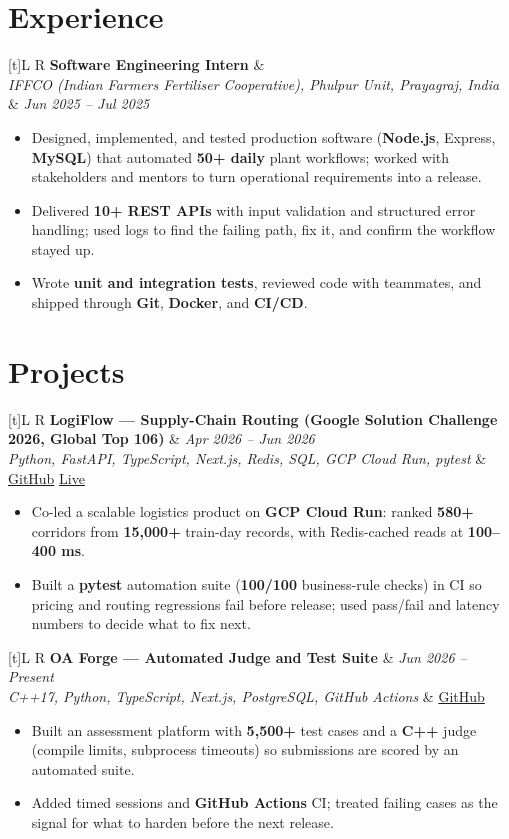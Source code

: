 \documentclass[a4paper,10pt]{article}
\newcommand{\resumeSubheading}[4]{%
  \vspace{0.4mm}
  \noindent
  \begin{tabularx}{\textwidth}[t]{L R}
    \textbf{#1} & #4 \\
    \textit{#3} & \textit{#2} \\
  \end{tabularx}
  \vspace{-0.4mm}%
}
\newcommand{\resumeProject}[4]{%
  \vspace{0.4mm}
  \noindent
  \begin{tabularx}{\textwidth}[t]{L R}
    \textbf{#1} & \textit{#3} \\
    \textit{#2} & #4 \\
  \end{tabularx}
  \vspace{-0.4mm}%
}
\begin{document}
\section{Experience}
\small
\resumeSubheading
  {Software Engineering Intern}{Jun 2025 -- Jul 2025}
  {IFFCO (Indian Farmers Fertiliser Cooperative), Phulpur Unit, Prayagraj, India}{}
\begin{itemize}
  \item Designed, implemented, and tested production software (\textbf{Node.js}, Express, \textbf{MySQL}) that automated \textbf{50+ daily} plant workflows; worked with stakeholders and mentors to turn operational requirements into a release.
  \item Delivered \textbf{10+ REST APIs} with input validation and structured error handling; used logs to find the failing path, fix it, and confirm the workflow stayed up.
  \item Wrote \textbf{unit and integration tests}, reviewed code with teammates, and shipped through \textbf{Git}, \textbf{Docker}, and \textbf{CI/CD}.
\end{itemize}

\section{Projects}
\small

\resumeProject
  {LogiFlow --- Supply-Chain Routing (Google Solution Challenge 2026, Global Top 106)}
  {Python, FastAPI, TypeScript, Next.js, Redis, SQL, GCP Cloud Run, pytest}
  {Apr 2026 -- Jun 2026}
  {\href{https://github.com/Ojas-Srivastava05/LogiFlow-Solution-Challenge-2026}{GitHub} \textbar{} \href{https://logi-flow-solution-challenge-2026.vercel.app}{Live}}
\begin{itemize}
  \item Co-led a scalable logistics product on \textbf{GCP Cloud Run}: ranked \textbf{580+} corridors from \textbf{15,000+} train-day records, with Redis-cached reads at \textbf{100--400 ms}.
  \item Built a \textbf{pytest} automation suite (\textbf{100/100} business-rule checks) in CI so pricing and routing regressions fail before release; used pass/fail and latency numbers to decide what to fix next.
\end{itemize}

\resumeProject
  {OA Forge --- Automated Judge and Test Suite}
  {C++17, Python, TypeScript, Next.js, PostgreSQL, GitHub Actions}
  {Jun 2026 -- Present}
  {\href{https://github.com/Ojas-Srivastava05/automation-workflows}{GitHub}}
\begin{itemize}
  \item Built an assessment platform with \textbf{5,500+} test cases and a \textbf{C++} judge (compile limits, subprocess timeouts) so submissions are scored by an automated suite.
  \item Added timed sessions and \textbf{GitHub Actions} CI; treated failing cases as the signal for what to harden before the next release.
\end{itemize}
\end{document}
